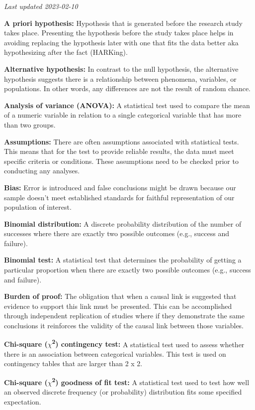 \documentclass[
]{book}
\begin{document}
\emph{Last updated 2023-02-10}

\textbf{A priori hypothesis:} Hypothesis that is generated before the research study takes place. Presenting the hypothesis before the study takes place helps in avoiding replacing the hypothesis later with one that fits the data better aka hypothesizing after the fact (HARKing).

\textbf{Alternative hypothesis:} In contrast to the null hypothesis, the alternative hypothesis suggests there is a relationship between phenomena, variables, or populations. In other words, any differences are not the result of random chance.

\textbf{Analysis of variance (ANOVA):} A statistical test used to compare the mean of a numeric variable in relation to a single categorical variable that has more than two groups.

\textbf{Assumptions:} There are often assumptions associated with statistical tests. This means that for the test to provide reliable results, the data must meet specific criteria or conditions. These assumptions need to be checked prior to conducting any analyses.

\textbf{Bias:} Error is introduced and false conclusions might be drawn because our sample doesn't meet established standards for faithful representation of our population of interest.

\textbf{Binomial distribution:} A discrete probability distribution of the number of successes where there are exactly two possible outcomes (e.g., success and failure).

\textbf{Binomial test:} A statistical test that determines the probability of getting a particular proportion when there are exactly two possible outcomes (e.g., success and failure).

\textbf{Burden of proof:} The obligation that when a causal link is suggested that evidence to support this link must be presented. This can be accomplished through independent replication of studies where if they demonstrate the same conclusions it reinforces the validity of the causal link between those variables.

\textbf{Chi-square (\(\chi\)\textsuperscript{2}) contingency test:} A statistical test used to assess whether there is an association between categorical variables. This test is used on contingency tables that are larger than 2 x 2.

\textbf{Chi-square (\(\chi\)\textsuperscript{2}) goodness of fit test:} A statistical test used to test how well an observed discrete frequency (or probability) distribution fits some specified expectation.
\end{document}
